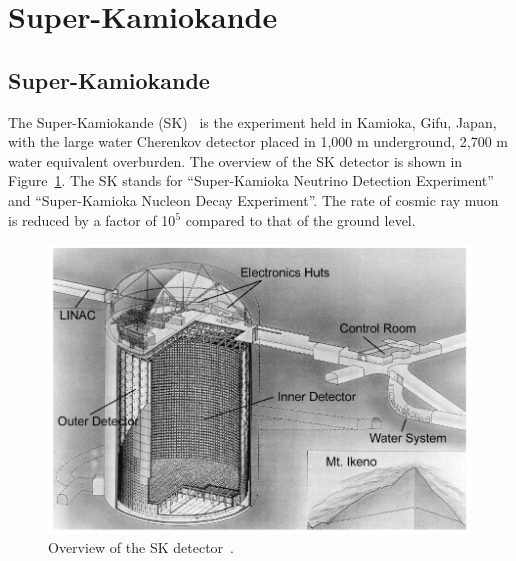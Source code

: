 
%
%

\section{Super-Kamiokande}\label{Section_SK}

\subsection{Super-Kamiokande}
\vs\hs The Super-Kamiokande (SK)~\cite{2003Fukuda} is the experiment held in Kamioka, Gifu, Japan, with the large water Cherenkov detector placed in 1,000 m underground, 2,700 m water equivalent overburden.
The overview of the SK detector is shown in Figure~\ref{SK_SK}.
The SK stands for ``Super-Kamioka Neutrino Detection Experiment'' and ``Super-Kamioka Nucleon Decay Experiment''.
The rate of cosmic ray muon is reduced by a factor of 10$^{\text{5}}$ compared to that of the ground level.\\

\begin{figure}[h]
	\centering
	\includegraphics[width=14cm]{Figures/SK/SK}
	\caption[Overview of the Super-Kamiokande detector]{\label{SK_SK} Overview of the SK detector~\cite{2003Fukuda}.}
\end{figure}

